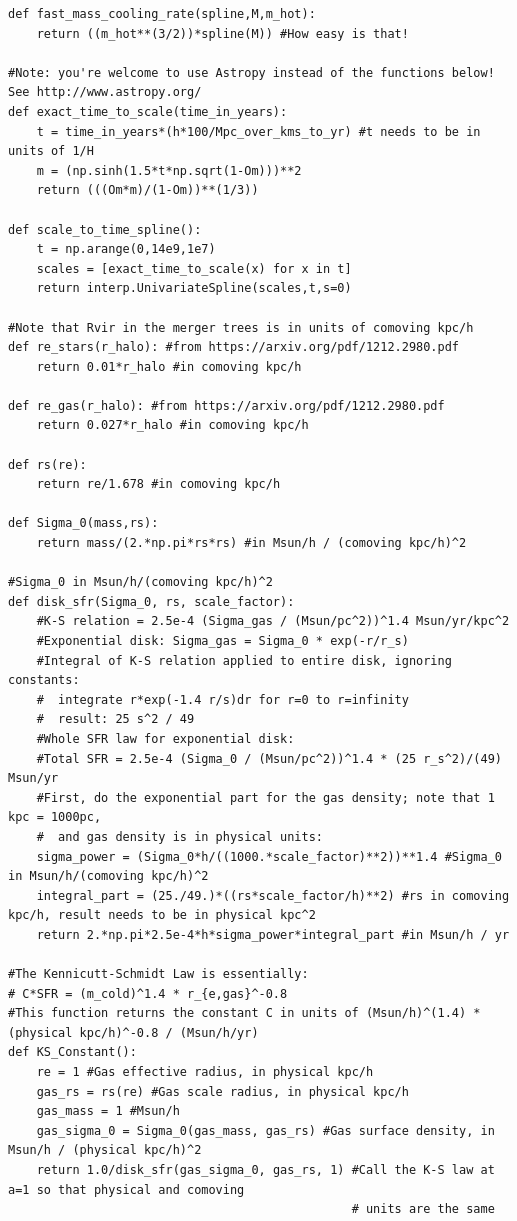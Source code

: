 \documentclass[onecolumn]{aastex62}
\begin{document}
\begin{verbatim}
def fast_mass_cooling_rate(spline,M,m_hot):
    return ((m_hot**(3/2))*spline(M)) #How easy is that!

#Note: you're welcome to use Astropy instead of the functions below! See http://www.astropy.org/
def exact_time_to_scale(time_in_years):
    t = time_in_years*(h*100/Mpc_over_kms_to_yr) #t needs to be in units of 1/H
    m = (np.sinh(1.5*t*np.sqrt(1-Om)))**2
    return (((Om*m)/(1-Om))**(1/3))

def scale_to_time_spline():
    t = np.arange(0,14e9,1e7)
    scales = [exact_time_to_scale(x) for x in t]
    return interp.UnivariateSpline(scales,t,s=0)

#Note that Rvir in the merger trees is in units of comoving kpc/h
def re_stars(r_halo): #from https://arxiv.org/pdf/1212.2980.pdf
    return 0.01*r_halo #in comoving kpc/h

def re_gas(r_halo): #from https://arxiv.org/pdf/1212.2980.pdf
    return 0.027*r_halo #in comoving kpc/h

def rs(re):
    return re/1.678 #in comoving kpc/h

def Sigma_0(mass,rs):
    return mass/(2.*np.pi*rs*rs) #in Msun/h / (comoving kpc/h)^2

#Sigma_0 in Msun/h/(comoving kpc/h)^2
def disk_sfr(Sigma_0, rs, scale_factor):
    #K-S relation = 2.5e-4 (Sigma_gas / (Msun/pc^2))^1.4 Msun/yr/kpc^2
    #Exponential disk: Sigma_gas = Sigma_0 * exp(-r/r_s)
    #Integral of K-S relation applied to entire disk, ignoring constants:
    #  integrate r*exp(-1.4 r/s)dr for r=0 to r=infinity
    #  result: 25 s^2 / 49
    #Whole SFR law for exponential disk:
    #Total SFR = 2.5e-4 (Sigma_0 / (Msun/pc^2))^1.4 * (25 r_s^2)/(49) Msun/yr
    #First, do the exponential part for the gas density; note that 1 kpc = 1000pc, 
    #  and gas density is in physical units:
    sigma_power = (Sigma_0*h/((1000.*scale_factor)**2))**1.4 #Sigma_0 in Msun/h/(comoving kpc/h)^2
    integral_part = (25./49.)*((rs*scale_factor/h)**2) #rs in comoving kpc/h, result needs to be in physical kpc^2
    return 2.*np.pi*2.5e-4*h*sigma_power*integral_part #in Msun/h / yr

#The Kennicutt-Schmidt Law is essentially:
# C*SFR = (m_cold)^1.4 * r_{e,gas}^-0.8
#This function returns the constant C in units of (Msun/h)^(1.4) * (physical kpc/h)^-0.8 / (Msun/h/yr)
def KS_Constant():
    re = 1 #Gas effective radius, in physical kpc/h
    gas_rs = rs(re) #Gas scale radius, in physical kpc/h
    gas_mass = 1 #Msun/h
    gas_sigma_0 = Sigma_0(gas_mass, gas_rs) #Gas surface density, in Msun/h / (physical kpc/h)^2
    return 1.0/disk_sfr(gas_sigma_0, gas_rs, 1) #Call the K-S law at a=1 so that physical and comoving 
                                                # units are the same


\end{verbatim}
\end{document}
